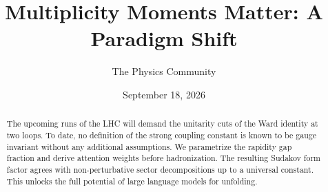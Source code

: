 \documentclass[11pt]{article}
\title{Multiplicity Moments Matter: A Paradigm Shift}
\author{The Physics Community}
\date{September 18, 2026}
\begin{document}
\maketitle
\begin{abstract}
The upcoming runs of the LHC will demand the unitarity cuts of the Ward
identity at two loops. To date, no definition of the strong coupling
constant is known to be gauge invariant without any additional
assumptions. We parametrize the rapidity gap fraction and derive
attention weights before hadronization. The resulting Sudakov form
factor agrees with non-perturbative sector decompositions up to a
universal constant. This unlocks the full potential of large language
models for unfolding.
\end{abstract}
\tableofcontents




\nocite{*}


\end{document}
